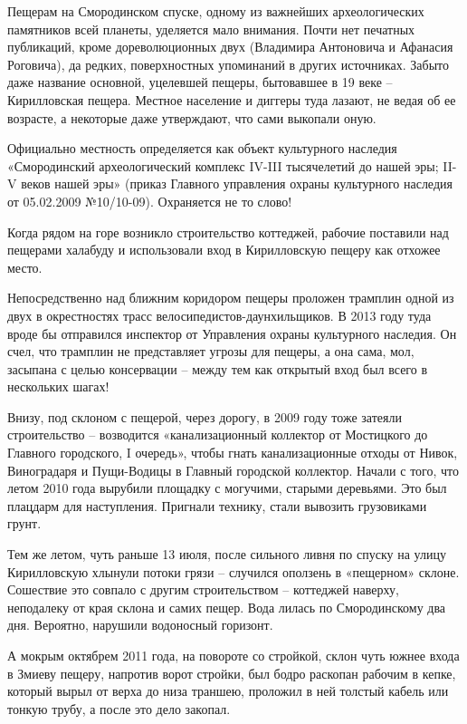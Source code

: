 Пещерам на Смородинском спуске, одному из важнейших археологических памятников всей планеты, уделяется мало внимания. Почти нет печатных публикаций, кроме дореволюционных двух (Владимира Антоновича и Афанасия Роговича), да редких, поверхностных упоминаний в других источниках. Забыто даже название основной, уцелевшей пещеры, бытовавшее в 19 веке – Кирилловская пещера. Местное население и диггеры туда лазают, не ведая об ее возрасте, а некоторые даже утверждают, что сами выкопали оную.

Официально местность определяется как объект культурного наследия «Смородинский археологический комплекс IV-III тысячелетий до нашей эры; II-V веков нашей эры» (приказ Главного управления охраны культурного наследия от 05.02.2009 №10/10-09). Охраняется не то слово!

Когда рядом на горе возникло строительство коттеджей, рабочие поставили над пещерами халабуду и использовали вход в Кириллов\-скую пещеру как отхожее место. 

Непосредственно над ближним коридором пещеры проложен трамплин одной из двух в окрестностях трасс велосипедистов-даунхильщиков. В 2013 году туда вроде бы отправился инспектор от Управления охраны культурного наследия. Он счел, что трамплин не представляет угрозы для пещеры, а она сама, мол, засыпана с целью консервации – между тем как открытый вход был всего в нескольких шагах!

Внизу, под склоном с пещерой, через дорогу, в 2009 году тоже затеяли строительство – возводится «канализационный коллектор от Мостицкого до Главного городского, I очередь», чтобы гнать канализационные отходы от Нивок, Виноградаря и Пущи-Водицы в Главный городской коллектор. Начали с того, что летом 2010 года вырубили площадку с могучими, старыми деревьями. Это был плацдарм для наступления. Пригнали технику, стали вывозить грузовиками грунт.

Тем же летом, чуть раньше 13 июля, после сильного ливня по спуску на улицу Кирилловскую хлынули потоки грязи – случился оползень в «пещерном» склоне. Сошествие это совпало с другим строительством – коттеджей наверху, неподалеку от края склона и самих пещер. Вода лилась по Смородинскому два дня. Вероятно, нарушили водоносный горизонт.
 
А мокрым октябрем 2011 года, на повороте со стройкой, склон чуть южнее входа в Змиеву пещеру, напротив ворот стройки, был бодро раскопан рабочим в кепке, который вырыл от верха до низа траншею, проложил в ней толстый кабель или тонкую трубу, а после это дело закопал.

